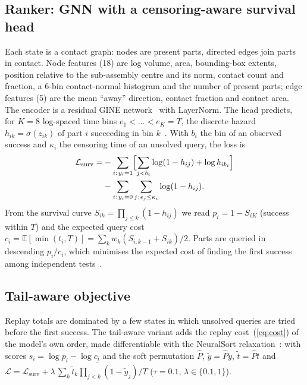 \documentclass[conference]{IEEEtran}
\begin{document}
\subsection{Ranker: GNN with a censoring-aware survival head}
Each state is a contact graph: nodes are present parts, directed edges join parts in contact. Node features (18) are
log volume, area, bounding-box extents, position relative to the sub-assembly centre and its norm, contact count and
fraction, a 6-bin contact-normal histogram and the number of present parts; edge features (5) are the mean
``away'' direction, contact fraction and contact area. The encoder is a residual GINE network~\cite{hu2020pretrain}
with LayerNorm. The head predicts, for $K=8$ log-spaced time bins $e_1<\dots<e_K=T$, the discrete hazard
$h_{ik}=\sigma(z_{ik})$ of part $i$ succeeding in bin $k$~\cite{gensheimer2019}. With $b_i$ the bin of an observed
success and $\kappa_i$ the censoring time of an unsolved query, the loss is
\begin{equation}
\begin{aligned}
\mathcal{L}_{\text{surv}}=&-\sum_{i:\,y_i=1}\Bigl[\sum_{j<b_i}\log(1-h_{ij})+\log h_{ib_i}\Bigr]\\
&-\sum_{i:\,y_i=0}\sum_{j:\,e_j\le \kappa_i}\log(1-h_{ij}).
\end{aligned}
\end{equation}
From the survival curve $S_{ik}=\prod_{j\le k}(1-h_{ij})$ we read $p_i=1-S_{iK}$ (success within $T$) and the expected
query cost $c_i=\mathbb{E}[\min(t_i,T)]=\sum_k w_k (S_{i,k-1}+S_{ik})/2$. Parts are queried in descending $p_i/c_i$,
which minimises the expected cost of finding the first success among independent tests~\cite{simon1975}.

\subsection{Tail-aware objective}
Replay totals are dominated by a few states in which unsolved queries are tried before the first success. The
tail-aware variant adds the replay cost~(\ref{eq:cost}) of the model's own order, made differentiable with the
NeuralSort relaxation~\cite{grover2019neuralsort}: with scores $s_i=\log p_i-\log c_i$ and the soft permutation
$\hat P$, $\tilde y=\hat P y$, $\tilde t=\hat P t$ and
$\mathcal{L}=\mathcal{L}_{\text{surv}}+\lambda\,\overline{\sum_k \tilde t_k\prod_{j<k}(1-\tilde y_j)}/T$
($\tau=0.1$, $\lambda\in\{0.1,1\}$).
\end{document}
